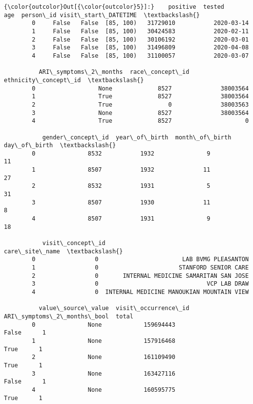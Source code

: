 \documentclass[11pt]{article}
\begin{document}
\begin{Verbatim}[commandchars=\\\{\}]
{\color{outcolor}Out[{\color{outcolor}5}]:}    positive  tested        age  person\_id visit\_start\_DATETIME  \textbackslash{}
        0     False   False  [85, 100)   31729010           2020-03-14   
        1     False   False  [85, 100)   30424583           2020-02-11   
        2     False   False  [85, 100)   30106192           2020-03-01   
        3     False   False  [85, 100)   31496809           2020-04-08   
        4     False   False  [85, 100)   31100057           2020-03-07   
        
          ARI\_symptoms\_2\_months  race\_concept\_id  ethnicity\_concept\_id  \textbackslash{}
        0                  None             8527              38003564   
        1                  True             8527              38003564   
        2                  True                0              38003563   
        3                  None             8527              38003564   
        4                  True             8527                     0   
        
           gender\_concept\_id  year\_of\_birth  month\_of\_birth  day\_of\_birth  \textbackslash{}
        0               8532           1932               9            11   
        1               8507           1932              11            27   
        2               8532           1931               5            31   
        3               8507           1930              11             8   
        4               8507           1931               9            18   
        
           visit\_concept\_id                             care\_site\_name  \textbackslash{}
        0                 0                        LAB BVMG PLEASANTON   
        1                 0                       STANFORD SENIOR CARE   
        2                 0       INTERNAL MEDICINE SAMARITAN SAN JOSE   
        3                 0                               VCP LAB DRAW   
        4                 0  INTERNAL MEDICINE MANOUKIAN MOUNTAIN VIEW   
        
          value\_source\_value  visit\_occurrence\_id  ARI\_symptoms\_2\_months\_bool  total  
        0               None            159694443                       False      1  
        1               None            157916468                        True      1  
        2               None            161109490                        True      1  
        3               None            163427116                       False      1  
        4               None            160595775                        True      1  
\end{Verbatim}
            
\end{document}
